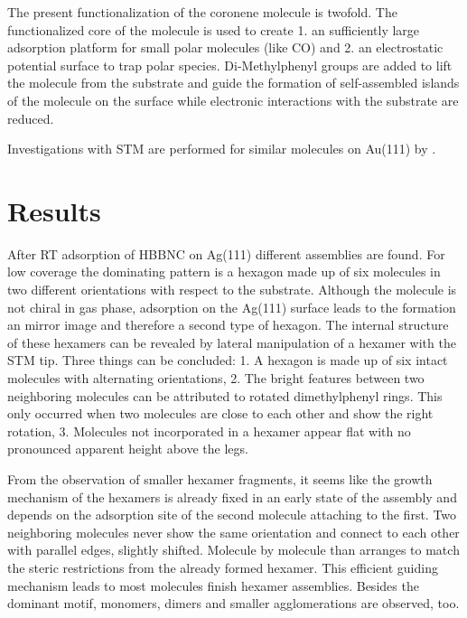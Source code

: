 The present functionalization of the coronene molecule is twofold. The functionalized core of the molecule is used to create 1. an sufficiently large adsorption platform for small polar molecules (like CO) and 2. an electrostatic potential surface to trap polar species. 
Di-Methylphenyl groups are added to lift the molecule from the substrate and guide the formation of self-assembled islands of the molecule on the surface while electronic interactions with the substrate are reduced.

Investigations with STM are performed for similar molecules on Au(111) by \cite{Krieg_construction_2015}.

\section{Results}
After RT adsorption of HBBNC on Ag(111) different assemblies are found. For low coverage the dominating pattern is a hexagon made up of six molecules in two different orientations with respect to the substrate. Although the molecule is not chiral in gas phase, adsorption on the Ag(111) surface leads to the formation an mirror image and therefore a second type of hexagon. The internal structure of these hexamers can be revealed by lateral manipulation of a hexamer with the STM tip. Three things can be concluded: 1. A hexagon is made up of six intact molecules with alternating orientations, 2. The bright features between two neighboring molecules can be attributed to rotated dimethylphenyl rings. This only occurred when two molecules are close to each other and show the right rotation, 3. Molecules not incorporated in a hexamer appear flat with no pronounced apparent height above the legs.

From the observation of smaller hexamer fragments, it seems like the growth mechanism of the hexamers is already fixed in an early state of the assembly and depends on the adsorption site of the second molecule attaching to the first. Two neighboring molecules never show the same orientation and connect to each other with parallel edges, slightly shifted.
Molecule by molecule than arranges to match the steric restrictions from the already formed hexamer. This efficient guiding mechanism leads to most molecules finish hexamer assemblies. 
Besides the dominant motif, monomers, dimers and smaller agglomerations are observed, too.

